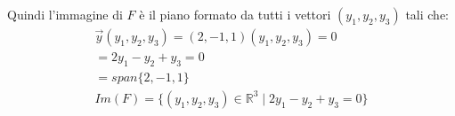 \documentclass{article}
\begin{document}
Quindi l’immagine di $F$ è il piano formato da tutti i vettori $(y_1,y_2,y_3)$ tali che:
\begin{align*}
    \vec{y}(y_1,y_2,y_3)=(2,-1,1)(y_1,y_2,y_3)=0\\
    =2y_1-y_2+y_3=0\\
    =span\{2,-1,1\}\\
    Im(F)=\{(y_1,y_2,y_3) \in \mathbb{R}^3 \mid 2y_1-y_2+y_3=0\}
\end{align*}
\end{document}
